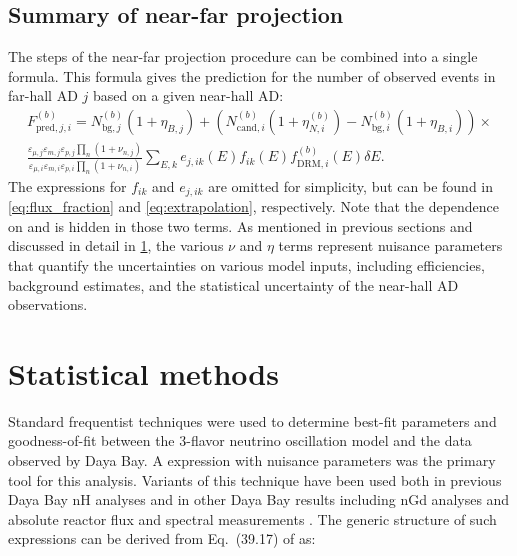 
\subsection{Summary of near-far projection}
\label{subsec:model_summary}

The steps of the near-far projection procedure can be combined into a single formula.
This formula gives the prediction for the number of observed events
in far-hall AD $j$ based on a given near-hall AD:
\begin{multline}\label{eq:full_prediction}
    F_{\text{pred},j,i}^{(b)} =
    N_{\text{bg},j}^{(b)}(1 + \eta_{B,j}) +
    (N_{\text{cand},i}^{(b)}(1 + \eta_{N,i}^{(b)}) - N_{\text{bg},i}^{(b)}
    (1 + \eta_{B,i})) \times \\
    \frac{
        \varepsilon_{\mu,j}\varepsilon_{m,j}\varepsilon_{p,j}
        \prod_n(1 + \nu_{n,j})
    }{
        \varepsilon_{\mu,i}\varepsilon_{m,i}\varepsilon_{p,i}\prod_n(1+\nu_{n,i})
    }
        \sum_{E,k}
        e_{j,ik}(E) f_{ik}(E)
        f_{\text{DRM},i}^{(b)}(E) \delta E.
\end{multline}
The expressions for $f_{ik}$ and $e_{j,ik}$ are omitted for simplicity,
but can be found in \cref{eq:flux_fraction} and \cref{eq:extrapolation}, respectively.
Note that the dependence on \thetaot{} and \dmee{} is hidden in those two terms.
As mentioned in previous sections and discussed in detail in \cref{sec:fitter},
the various $\nu$ and $\eta$ terms represent nuisance parameters
that quantify the uncertainties on various model inputs,
including efficiencies, background estimates,
and the statistical uncertainty of the near-hall AD observations.

\section{Statistical methods}
\label{sec:fitter}

Standard frequentist techniques were used to determine best-fit parameters
and goodness-of-fit between the 3-flavor neutrino oscillation model
and the data observed by Daya Bay.
A \chisquare{} expression with nuisance parameters
was the primary tool for this analysis.
Variants of this technique have been used both in previous Daya Bay nH analyses
and in other Daya Bay results including nGd \thetaot{} analyses
and absolute reactor \nuebar{} flux and spectral measurements
\cite{nh2016,ngd2016,reactorflux2017,extractionreactorflux2019}.
The generic structure of such \chisquare{} expressions
can be derived from Eq.~(39.17) of \cite{pdg} as:

